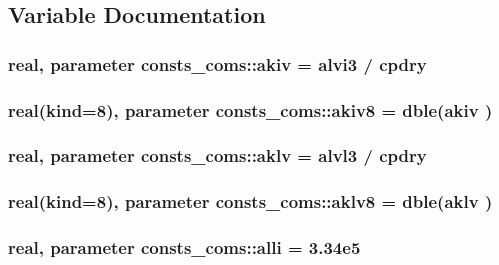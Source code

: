 \subsection{Variable Documentation}
\subsubsection[{\texorpdfstring{akiv}{akiv}}]{\setlength{\rightskip}{0pt plus 5cm}real, parameter consts\+\_\+coms\+::akiv = {\bf alvi3} / {\bf cpdry}}\hypertarget{namespaceconsts__coms_a59810df1b5b54dbe510de801eb433951}{}\label{namespaceconsts__coms_a59810df1b5b54dbe510de801eb433951}
\subsubsection[{\texorpdfstring{akiv8}{akiv8}}]{\setlength{\rightskip}{0pt plus 5cm}real(kind=8), parameter consts\+\_\+coms\+::akiv8 = dble({\bf akiv} )}\hypertarget{namespaceconsts__coms_a6a7209c2fd5f7e59d9dac0d61368fe74}{}\label{namespaceconsts__coms_a6a7209c2fd5f7e59d9dac0d61368fe74}
\subsubsection[{\texorpdfstring{aklv}{aklv}}]{\setlength{\rightskip}{0pt plus 5cm}real, parameter consts\+\_\+coms\+::aklv = {\bf alvl3} / {\bf cpdry}}\hypertarget{namespaceconsts__coms_a5f00cfbd5e6d86aeaafaddbda45f58d0}{}\label{namespaceconsts__coms_a5f00cfbd5e6d86aeaafaddbda45f58d0}
\subsubsection[{\texorpdfstring{aklv8}{aklv8}}]{\setlength{\rightskip}{0pt plus 5cm}real(kind=8), parameter consts\+\_\+coms\+::aklv8 = dble({\bf aklv} )}\hypertarget{namespaceconsts__coms_a03b5f451f4332f706d323b3de82210d9}{}\label{namespaceconsts__coms_a03b5f451f4332f706d323b3de82210d9}
\subsubsection[{\texorpdfstring{alli}{alli}}]{\setlength{\rightskip}{0pt plus 5cm}real, parameter consts\+\_\+coms\+::alli = 3.\+34e5}\hypertarget{namespaceconsts__coms_aed7ce8242223a8b27f2052b3082e34d8}{}\label{namespaceconsts__coms_aed7ce8242223a8b27f2052b3082e34d8}
